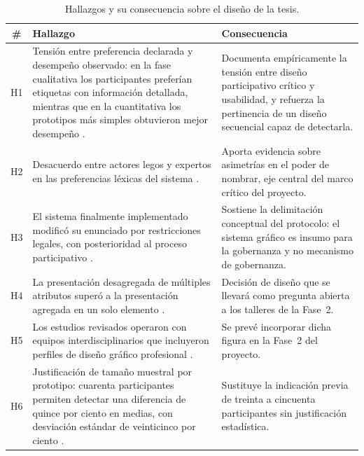 \documentclass[letter,12pt]{article}
\begin{document}
\begin{table}[H]
\centering
\footnotesize
\caption{Hallazgos y su consecuencia sobre el diseño de la tesis.}
\label{tab:hallazgos}
\renewcommand{\arraystretch}{1.35}
\begin{tabular}{|c|p{5.4cm}|p{5.8cm}|}
\hline
\rowcolor{bgCotejo}
\textbf{\#} & \textbf{Hallazgo} & \textbf{Consecuencia} \\
\hline
H1 & Tensión entre preferencia declarada y desempeño observado: en la fase cualitativa los participantes preferían etiquetas con información detallada, mientras que en la cuantitativa los prototipos más simples obtuvieron mejor desempeño \citep{reyes2019desarrollo}. & Documenta empíricamente la tensión entre diseño participativo crítico y usabilidad, y refuerza la pertinencia de un diseño secuencial capaz de detectarla. \\
\hline
H2 & Desacuerdo entre actores legos y expertos en las preferencias léxicas del sistema \citep{reyes2019desarrollo}. & Aporta evidencia sobre asimetrías en el poder de nombrar, eje central del marco crítico del proyecto. \\
\hline
H3 & El sistema finalmente implementado modificó su enunciado por restricciones legales, con posterioridad al proceso participativo \citep{reyes2019desarrollo}. & Sostiene la delimitación conceptual del protocolo: el sistema gráfico es insumo para la gobernanza y no mecanismo de gobernanza. \\
\hline
H4 & La presentación desagregada de múltiples atributos superó a la presentación agregada en un solo elemento \citep{reyes2019desarrollo}. & Decisión de diseño que se llevará como pregunta abierta a los talleres de la Fase~2. \\
\hline
H5 & Los estudios revisados operaron con equipos interdisciplinarios que incluyeron perfiles de diseño gráfico profesional \citep{reyes2019desarrollo,vargasmeza2019comprension}. & Se prevé incorporar dicha figura en la Fase~2 del proyecto. \\
\hline
H6 & Justificación de tamaño muestral por prototipo: cuarenta participantes permiten detectar una diferencia de quince por ciento en medias, con desviación estándar de veinticinco por ciento \citep{reyes2019desarrollo}. & Sustituye la indicación previa de treinta a cincuenta participantes sin justificación estadística. \\
\hline
\end{tabular}
\end{table}

\end{document}
